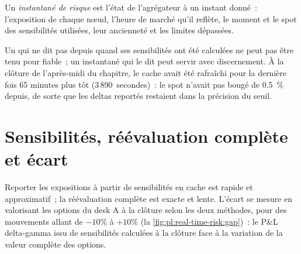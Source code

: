 \begin{definition}\label{def:pl:real-time-risk:snapshot}
Un \emph{instantané de risque} est l'état de l'agrégateur à un instant donné~: l'exposition de chaque nœud, l'heure de marché qu'il reflète, le
moment et le spot des sensibilités utilisées, leur ancienneté et les limites dépassées.
\end{definition}

Un  qui ne dit pas depuis quand ses sensibilités ont été calculées ne peut pas être tenu pour fiable~; un instantané qui le dit peut servir avec discernement. À la clôture de
l'après-midi du chapitre, le cache avait été rafraîchi pour la dernière fois 65 minutes plus tôt (3\,890~secondes)~: le spot n'avait pas bougé de 0.5~\% depuis, de sorte que les
deltas reportés restaient dans la précision du seuil.

\section{Sensibilités, réévaluation complète et écart}

Reporter les expositions à partir de sensibilités en cache est rapide et approximatif~; la réévaluation complète est exacte et lente. L'écart se mesure en valorisant
les options du desk A à la clôture selon les deux méthodes, pour des mouvements allant de $-10\%$ à $+10\%$ (la \cref{fig:pl:real-time-risk:gap})~: le P\&L delta-gamma issu de
sensibilités calculées à la clôture face à la variation de la valeur complète des options.

\begin{omfigure}

\label{fig:pl:real-time-risk:gap}
\end{omfigure}

